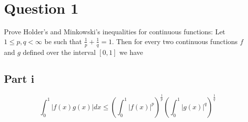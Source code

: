 \section{Question 1}

\begin{question}
    Prove Holder's and Minkowski's inequalities for continuous functions: Let $1 \leq p, q<\infty$ be such that $\frac{1}{p}+\frac{1}{q}=1$. Then for every two continuous functions $f$ and $g$ defined over the interval $[0,1]$ we have
\end{question}

\subsection{Part i}

\begin{question}
    \begin{equation}
        \int_0^1|f(x) g(x)| d x \leq\left(\int_0^1|f(x)|^p\right)^{\frac{1}{p}}\left(\int_0^1|g(x)|^q\right)^{\frac{1}{q}}
    \end{equation}
\end{question}


